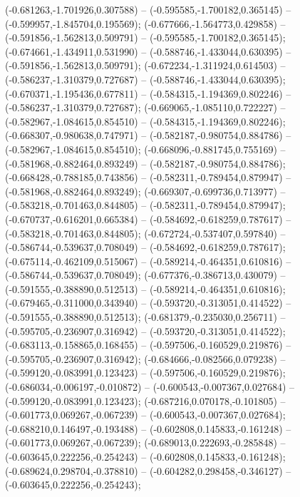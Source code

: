  (-0.681263,-1.701926,0.307588) -- (-0.595585,-1.700182,0.365145) -- (-0.599957,-1.845704,0.195569);
 (-0.677666,-1.564773,0.429858) -- (-0.591856,-1.562813,0.509791) -- (-0.595585,-1.700182,0.365145);
 (-0.674661,-1.434911,0.531990) -- (-0.588746,-1.433044,0.630395) -- (-0.591856,-1.562813,0.509791);
 (-0.672234,-1.311924,0.614503) -- (-0.586237,-1.310379,0.727687) -- (-0.588746,-1.433044,0.630395);
 (-0.670371,-1.195436,0.677811) -- (-0.584315,-1.194369,0.802246) -- (-0.586237,-1.310379,0.727687);
 (-0.669065,-1.085110,0.722227) -- (-0.582967,-1.084615,0.854510) -- (-0.584315,-1.194369,0.802246);
 (-0.668307,-0.980638,0.747971) -- (-0.582187,-0.980754,0.884786) -- (-0.582967,-1.084615,0.854510);
 (-0.668096,-0.881745,0.755169) -- (-0.581968,-0.882464,0.893249) -- (-0.582187,-0.980754,0.884786);
 (-0.668428,-0.788185,0.743856) -- (-0.582311,-0.789454,0.879947) -- (-0.581968,-0.882464,0.893249);
 (-0.669307,-0.699736,0.713977) -- (-0.583218,-0.701463,0.844805) -- (-0.582311,-0.789454,0.879947);
 (-0.670737,-0.616201,0.665384) -- (-0.584692,-0.618259,0.787617) -- (-0.583218,-0.701463,0.844805);
 (-0.672724,-0.537407,0.597840) -- (-0.586744,-0.539637,0.708049) -- (-0.584692,-0.618259,0.787617);
 (-0.675114,-0.462109,0.515067) -- (-0.589214,-0.464351,0.610816) -- (-0.586744,-0.539637,0.708049);
 (-0.677376,-0.386713,0.430079) -- (-0.591555,-0.388890,0.512513) -- (-0.589214,-0.464351,0.610816);
 (-0.679465,-0.311000,0.343940) -- (-0.593720,-0.313051,0.414522) -- (-0.591555,-0.388890,0.512513);
 (-0.681379,-0.235030,0.256711) -- (-0.595705,-0.236907,0.316942) -- (-0.593720,-0.313051,0.414522);
 (-0.683113,-0.158865,0.168455) -- (-0.597506,-0.160529,0.219876) -- (-0.595705,-0.236907,0.316942);
 (-0.684666,-0.082566,0.079238) -- (-0.599120,-0.083991,0.123423) -- (-0.597506,-0.160529,0.219876);
 (-0.686034,-0.006197,-0.010872) -- (-0.600543,-0.007367,0.027684) -- (-0.599120,-0.083991,0.123423);
 (-0.687216,0.070178,-0.101805) -- (-0.601773,0.069267,-0.067239) -- (-0.600543,-0.007367,0.027684);
 (-0.688210,0.146497,-0.193488) -- (-0.602808,0.145833,-0.161248) -- (-0.601773,0.069267,-0.067239);
 (-0.689013,0.222693,-0.285848) -- (-0.603645,0.222256,-0.254243) -- (-0.602808,0.145833,-0.161248);
 (-0.689624,0.298704,-0.378810) -- (-0.604282,0.298458,-0.346127) -- (-0.603645,0.222256,-0.254243);
